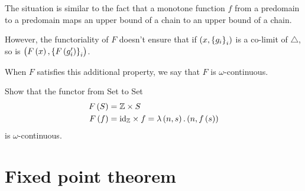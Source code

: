 \begin{enumcirc}
	The situation is similar to the fact that a monotone function $f$ from a
	predomain to a predomain maps an upper bound of a chain to an upper bound of a
	chain.
	\item
	However, the functoriality of $F$ doesn't ensure that if $\left( x,
			\left\{ g_i \right\}_i \right)$ is a co-limit of $\triangle$, so is $\left( F\left( x \right),
			\left\{ F\left( g'_i \right) \right\}_i \right)$.

	When $F$ satisfies this additional property, we say that $F$ is
	$\omega$-continuous.
	\begin{exercisetab}
		Show that the functor from Set to Set
		\begin{align*}
			F\left( S \right) & = \mathbb{Z} \times S                                                   \\
			F\left( f \right) & = \textrm{id}_{\mathbb{Z}} \times f = \lambda \left( n, s \right). \left( n, f\left( s \right) \right)
		\end{align*}
		is $\omega$-continuous.
	\end{exercisetab}
\end{enumcirc}

\section{Fixed point theorem}

